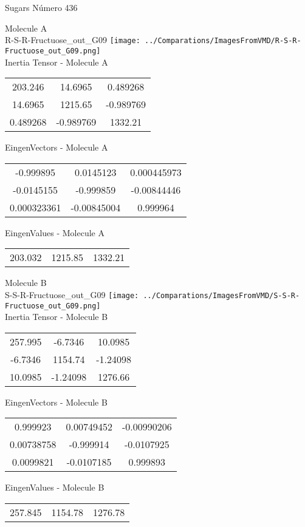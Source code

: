 \vtab[-2cm]
\begin{center}
{\large Sugars \tab Número 436}
\end{center}
\begin{multicols}{2}
\begin{center}

Molecule A \\ 
R-S-R-Fructuose\_out\_G09
\texttt{[image: ../Comparations/ImagesFromVMD/R-S-R-Fructuose\_out\_G09.png]}
\\
Inertia Tensor - Molecule A \\
\vtab

\begin{tabular}{|c c c|}
203.246	 & 	14.6965	 & 	0.489268	 \\
14.6965	 & 	1215.65	 & 	-0.989769	 \\
0.489268	 & 	-0.989769	 & 	1332.21
\end{tabular}

\vtab
 EingenVectors - Molecule A     \\
\vtab
\begin{tabular}{|c c c|}
-0.999895	 & 	0.0145123	 & 	0.000445973	 \\
-0.0145155	 & 	-0.999859	 & 	-0.00844446	 \\
0.000323361	 & 	-0.00845004	 & 	0.999964
\end{tabular}

\vtab
 EingenValues - Molecule A     \\
\vtab
\begin{tabular}{|c c c|}
203.032	 & 	1215.85	 & 	1332.21	 \\
\end{tabular}
\columnbreak

Molecule B \\ 
S-S-R-Fructuose\_out\_G09
\texttt{[image: ../Comparations/ImagesFromVMD/S-S-R-Fructuose\_out\_G09.png]}
\\
Inertia Tensor - Molecule B \\
\vtab

\begin{tabular}{|c c c|}
257.995	 & 	-6.7346	 & 	10.0985	 \\
-6.7346	 & 	1154.74	 & 	-1.24098	 \\
10.0985	 & 	-1.24098	 & 	1276.66
\end{tabular}

\vtab
 EingenVectors - Molecule B     \\
\vtab
\begin{tabular}{|c c c|}
0.999923	 & 	0.00749452	 & 	-0.00990206	 \\
0.00738758	 & 	-0.999914	 & 	-0.0107925	 \\
0.0099821	 & 	-0.0107185	 & 	0.999893
\end{tabular}

\vtab
 EingenValues - Molecule B     \\
\vtab
\begin{tabular}{|c c c|}
257.845	 & 	1154.78	 & 	1276.78	 \\
\end{tabular}

\end{center}
\end{multicols}
